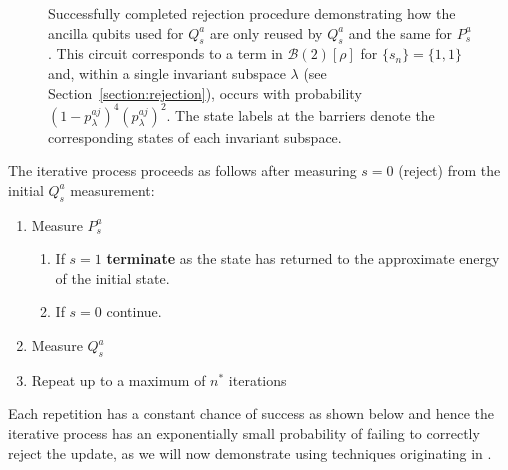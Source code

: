 \documentclass[aps,floatfix,10pt,amssymb,amsfont,amsmath,superscriptaddress,float,nofootinbib,longbibliography,nobalancelastpage,twocolumn]{revtex4-2}
\begin{document}
\begin{figure}
\caption{Successfully completed rejection procedure demonstrating how the ancilla qubits used for $Q_s^a$ are only reused by $Q_s^a$ and the same for $P_s^a$. This circuit corresponds to a term in $\mathcal{B}(2)[\rho]$ for $\{s_n\} = \{1,1\}$ and, within a single invariant subspace $\lambda$ (see Section~\ref{section:rejection}), occurs with probability $(1-p^{aj}_{\lambda})^4(p^{aj}_{\lambda})^2$. The state labels at the barriers denote the corresponding states of each invariant subspace.}
\label{fig:fullcircuit}
\end{figure}

The iterative process proceeds as follows after measuring $s=0$ (reject) from the initial $Q_s^a$ measurement: 
\begin{enumerate}
    \item Measure $P_s^a$
        \begin{enumerate}
            \item If $s=1$ \textbf{terminate} as the state has returned to the approximate energy of the initial state.
            \item If $s=0$ continue.
        \end{enumerate}
    \item Measure $Q_s^a$
    \item Repeat up to a maximum of $n^*$ iterations
\end{enumerate}
Each repetition has a constant chance of success as shown below and hence the iterative process has an exponentially small probability of failing to correctly reject the update, as we will now demonstrate using techniques originating in \cite{MarriottWatrous}. 
\end{document}

